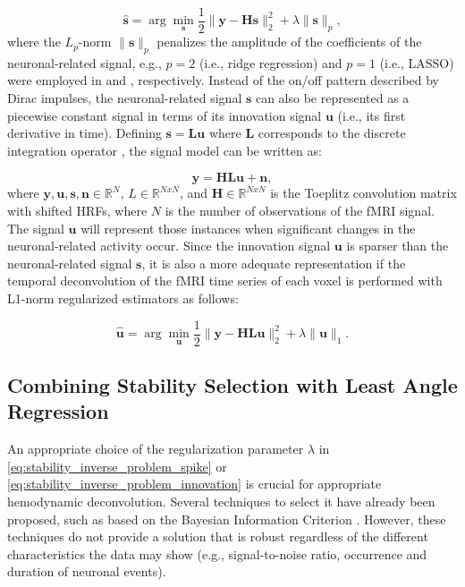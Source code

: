 \begin{equation}
    \mathbf{\hat{s}} = \arg \min_{\mathbf{s}} \frac{1}{2} \|\mathbf{y} - \mathbf{Hs}\|_2^2 + \lambda \|\mathbf{s}\|_p,
    \label{eq:stability_inverse_problem_spike}
\end{equation}
where the $L_p$-norm $\| \mathbf{s} \|_p$ penalizes the amplitude of the
coefficients of the neuronal-related signal, e.g., $p = 2$ (i.e., ridge
regression) and $p = 1$ (i.e., LASSO) were employed in
\citep{Gaudes2010Detectioncharacterizationsingle} and
\citep{Gaudes2013Paradigmfreemapping}, respectively. Instead of the on/off
pattern described by Dirac impulses, the neuronal-related signal $\mathbf{s}$
can also be represented as a piecewise constant signal in terms of its
innovation signal $\mathbf{u}$ (i.e., its first derivative in time). Defining
$\mathbf{s}=\mathbf{Lu}$ where $\mathbf{L}$ corresponds to the discrete
integration operator \citep{Cherkaoui2019Sparsitybasedblind}, the signal model
can be written as:

\begin{equation}
    \mathbf{y} = \mathbf{HLu} + \mathbf{n},
    \label{eq:stability_signal_model}
\end{equation}
where $\mathbf{y}, \mathbf{u}, \mathbf{s}, \mathbf{n} \in \mathbb{R}^N$, $L \in
\mathbb{R}^{NxN}$, and $\mathbf{H} \in \mathbb{R}^{NxN}$ is the Toeplitz convolution
matrix with shifted HRFs, where $N$ is the number of observations of the fMRI
signal. The signal $\mathbf{u}$ will represent those instances when significant
changes in the neuronal-related activity occur. Since the innovation signal
$\mathbf{u}$ is sparser than the neuronal-related signal $\mathbf{s}$, it is
also a more adequate representation if the temporal deconvolution of the fMRI
time series of each voxel is performed with L1-norm regularized estimators as
follows:

\begin{equation}
    \mathbf{\hat{u}} = \arg \min_{\mathbf{u}} \frac{1}{2} \|\mathbf{y} - \mathbf{HLu}\|_2^2 + \lambda \|\mathbf{u}\|_1.
    \label{eq:stability_inverse_problem_innovation}
\end{equation}


\subsection{Combining Stability Selection with Least Angle Regression}

An appropriate choice of the regularization parameter $\lambda$ in
\cref{eq:stability_inverse_problem_spike} or
\cref{eq:stability_inverse_problem_innovation} is crucial for appropriate hemodynamic deconvolution. Several techniques to select it have already been proposed, such as based on the
Bayesian Information Criterion \citep{Gaudes2013Paradigmfreemapping}. However,
these techniques do not provide a solution that is robust regardless
of the different characteristics the data may show (e.g., signal-to-noise ratio,
occurrence and duration of neuronal events). 

